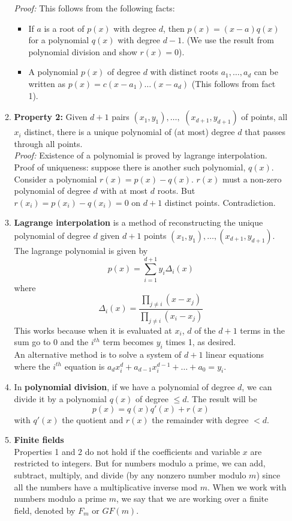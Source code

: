 \documentclass[10pt]{article}
\begin{document}
\begin{multicols}{2}
\begin{enumerate}
\begin{enumerate}
    \textit{Proof:} This follows from the following facts:
    \begin{itemize}
        \item If $a$ is a root of $p(x)$ with degree $d$, then $p(x) = (x - a)q(x)$ for a polynomial $q(x)$ with degree $d - 1$. (We use the result from polynomial division and show $r(x)=0$).
        \item A polynomial $p(x)$ of degree $d$ with distinct roots $a_1,\hdots,a_d$ can be written as $p(x)=c(x-a_1) \ldots (x-a_d)$ (This follows from fact 1).
    \end{itemize}
    \item \textbf{Property 2:} Given $d+1$ pairs $(x_1,y_1),\hdots,$ $(x_{d+1}, y_{d+1})$ of points, all $x_i$ distinct, there is a unique polynomial of (at most) degree $d$ that passes through all points. \\[8 pt]
    \textit{Proof:} Existence of a polynomial is proved by lagrange interpolation. Proof of uniqueness: suppose there is another such polynomial, $q(x)$. Consider a polynomial $r(x)=p(x)-q(x)$. $r(x)$ must a non-zero polynomial of degree $d$ with at most $d$ roots. But $r(x_i)=p(x_i)-q(x_i)=0$ on $d+1$ distinct points. Contradiction.
    \item \textbf{Lagrange interpolation} is a method of reconstructing the unique polynomial of degree $d$ given $d+1$ points $(x_1,y_1), \hdots,(x_{d+1}, y_{d+1})$. The lagrange polynomial is given by 
    $$p(x)=\sum_{i=1}^{d+1} y_i \Delta_i(x)$$ where
    $$\Delta_i(x)=\frac{\prod_{j \neq i} (x-x_j)}{\prod_{j \neq i} (x_i-x_j)}$$ 
    This works because when it is evaluated at $x_i$, $d$ of the $d+1$ terms in the sum go to 0 and the $i^{th}$ term becomes $y_i$ times 1, as desired. \\[8 pt]
    An alternative method is to solve a system of $d+1$ linear equations where the $i^{th}$ equation is $a_dx_{i}^{d}+a_{d-1}x_i^{d-1}+\hdots+a_0=y_i$.
    \item In \textbf{polynomial division}, if we have a polynomial of degree $d$, we can divide it by a polynomial $q(x)$ of degree $\leq d$. The result will be $$p(x)=q(x)q'(x)+r(x)$$ with $q'(x)$ the quotient and $r(x)$ the remainder with degree $< d$.
    
    \item \textbf{Finite fields} \\
    Properties 1 and 2 do not hold if the coefficients and variable $x$ are restricted to integers. But for numbers modulo a prime, we can add, subtract, multiply, and divide (by any nonzero number modulo $m$) since all the numbers have a multiplicative inverse mod $m$. When we work with numbers modulo a prime $m$, we say that we are working over a finite field, denoted by $F_m$ or $GF(m)$.
    

\end{enumerate}
\end{enumerate}
\end{multicols}
\end{document}

